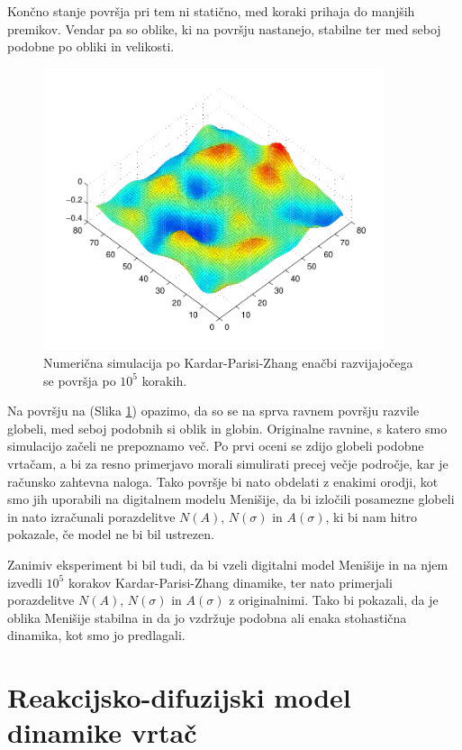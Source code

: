 \documentclass[a4paper, twoside, 12pt]{book}
\begin{document}
Končno stanje površja pri tem ni statično, med koraki prihaja do manjših premikov. Vendar pa so oblike, ki na površju nastanejo, stabilne ter med seboj podobne po obliki in velikosti.

    \begin{figure}[h]
      \begin{center}
        \includegraphics[width=10cm]{slike/KPZ-numericno}
      \end{center}
      \caption{Numerična simulacija po Kardar-Parisi-Zhang enačbi razvijajočega se površja po $10^5$ korakih.}
      \label{fig:KPZ-numericno}
    \end{figure}

Na površju na (Slika \ref{fig:KPZ-numericno}) opazimo, da so se na sprva ravnem površju razvile globeli, med seboj podobnih si oblik in globin. Originalne ravnine, s katero smo simulacijo začeli ne prepoznamo več. Po prvi oceni se zdijo globeli podobne vrtačam, a bi za resno primerjavo morali simulirati precej večje področje, kar je računsko zahtevna naloga. Tako površje bi nato obdelati z enakimi orodji, kot smo jih uporabili na digitalnem modelu Menišije, da bi izločili posamezne globeli in nato izračunali porazdelitve $N(A)$, $N(\sigma)$ in $A(\sigma)$, ki bi nam hitro pokazale, če model ne bi bil ustrezen.

Zanimiv eksperiment bi bil tudi, da bi vzeli digitalni model Menišije in na njem izvedli $10^5$ korakov Kardar-Parisi-Zhang dinamike, ter nato primerjali porazdelitve $N(A)$, $N(\sigma)$ in $A(\sigma)$ z originalnimi. Tako bi pokazali, da je oblika Menišije stabilna in da jo vzdržuje podobna ali enaka stohastična dinamika, kot smo jo predlagali.


\section{Reakcijsko-difuzijski model dinamike vrtač}
\end{document}
